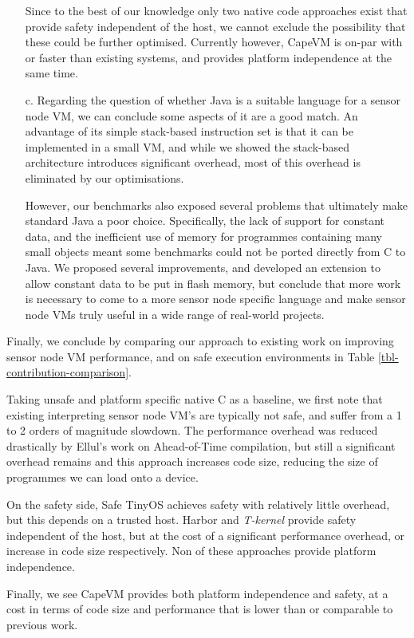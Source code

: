 \begin{enumerate}
	Since to the best of our knowledge only two native code approaches exist that provide safety independent of the host, we cannot exclude the possibility that these could be further optimised. Currently however, CapeVM is on-par with or faster than existing systems, and provides platform independence at the same time.

	\item[c.]
	Regarding the question of whether Java is a suitable language for a sensor node VM, we can conclude some aspects of it are a good match. An advantage of its simple stack-based instruction set is that it can be implemented in a small VM, and while we showed the stack-based architecture introduces significant overhead, most of this overhead is eliminated by our optimisations.
	
	However, our benchmarks also exposed several problems that ultimately make standard Java a poor choice. Specifically, the lack of support for constant data, and the inefficient use of memory for programmes containing many small objects meant some benchmarks could not be ported directly from C to Java. We proposed several improvements, and developed an extension to allow constant data to be put in flash memory, but conclude that more work is necessary to come to a more sensor node specific language and make sensor node VMs truly useful in a wide range of real-world projects.
\end{enumerate}



Finally, we conclude by comparing our approach to existing work on improving sensor node VM performance, and on safe execution environments in Table \ref{tbl-contribution-comparison}.

Taking unsafe and platform specific native C as a baseline, we first note that existing interpreting sensor node VM's are typically not safe, and suffer from a 1 to 2 orders of magnitude slowdown. The performance overhead was reduced drastically by Ellul's work on Ahead-of-Time compilation, but still a significant overhead remains and this approach increases code size, reducing the size of programmes we can load onto a device.

On the safety side, Safe TinyOS achieves safety with relatively little overhead, but this depends on a trusted host. Harbor and \emph{T-kernel} provide safety independent of the host, but at the cost of a significant performance overhead, or increase in code size respectively. Non of these approaches provide platform independence.

Finally, we see CapeVM provides both platform independence and safety, at a cost in terms of code size and performance that is lower than or comparable to previous work.

